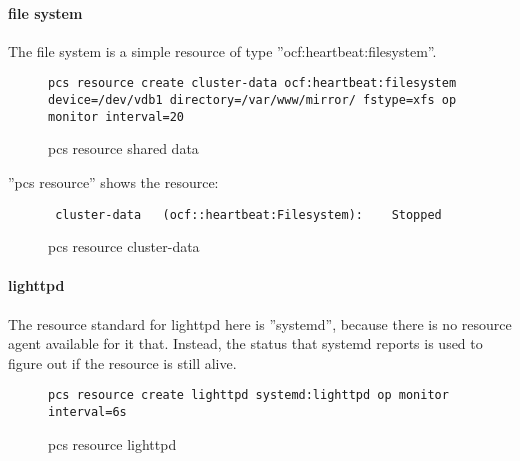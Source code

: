 \paragraph{file system}
The file system is a simple resource of type ''ocf:heartbeat:filesystem''.
\begin{figure}
\begin{lstlisting}
pcs resource create cluster-data ocf:heartbeat:filesystem device=/dev/vdb1 directory=/var/www/mirror/ fstype=xfs op monitor interval=20
\end{lstlisting}
\caption{pcs resource shared data}
\end{figure}
''pcs resource'' shows the resource:
\begin{figure}
\begin{lstlisting}
 cluster-data	(ocf::heartbeat:Filesystem):	Stopped 
\end{lstlisting}
\caption{pcs resource cluster-data}
\end{figure}
\paragraph{lighttpd}
The resource standard for lighttpd here is ''systemd'', because there is no resource
agent available for it that. Instead, the status that systemd reports is used to figure
out if the resource is still alive.
\begin{figure}
\begin{lstlisting}
pcs resource create lighttpd systemd:lighttpd op monitor interval=6s
\end{lstlisting}
\caption{pcs resource lighttpd}
\end{figure}
